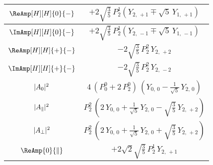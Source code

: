 \begin{table}[p]
\begin{tabular}{cc}
    $\ReAmp[H][H]{0}{-}$  &
      $+2\sqrt{\tfrac{3}{5}}\, P_2^1 (Y_{2,\,+1} \mp \sqrt{5}\, Y_{1,\,+1})$  \\
    \hline

    $\ImAmp[H][H]{0}{-}$  &
      $+2\sqrt{\tfrac{3}{5}}\, P_2^1 (Y_{2,\,-1} \mp \sqrt{5}\, Y_{1,\,-1})$  \\
    \hline

    $\ReAmp[H][H]{+}{-}$  &
      $-2\sqrt{\tfrac{3}{5}}\, P_2^2\, Y_{2,\,+2}$  \\
    \hline

    $\ImAmp[H][H]{+}{-}$  &
      $-2\sqrt{\tfrac{3}{5}}\, P_2^2\, Y_{2,\,-2}$  \\
    \hline\hline

    $|{A}_{0}|^2$  &
      $4\, (P_0^0 + 2\, P_2^0)\, (Y_{0,\,0} - \tfrac{1}{\sqrt{5}}\, Y_{2,\,0})$  \\
    \hline

    $|{A}_{\parallel}|^2$  &
      $P_2^2\, (2\, Y_{0,\,0} + \tfrac{1}{\sqrt{5}}\, Y_{2,\,0} - \sqrt{\tfrac{3}{5}}\, Y_{2,\,+2})$  \\
    \hline

    $|{A}_{\perp}|^2$  &
      $P_2^2\, (2\, Y_{0,\,0} + \tfrac{1}{\sqrt{5}}\, Y_{2,\,0} + \sqrt{\tfrac{3}{5}}\, Y_{2,\,+2})$  \\
    \hline

    $\ReAmp{0}{\parallel}$  &
      $+2\sqrt{2}\sqrt{\tfrac{3}{5}}\, P_2^1\, Y_{2,\,+1}$  \\
    \hline


\end{tabular}
\end{table}
